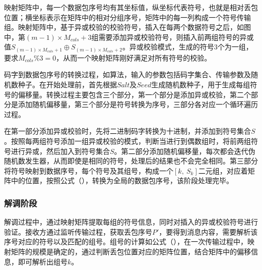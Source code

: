 映射矩阵中，每一个数据包序号均有其坐标值，纵坐标代表符号，也就是相对丢包位置；横坐标表示在矩阵中的相对分组序号，矩阵中的每一列构成一个符号传输组。映射矩阵中，基于异或校验的校验符号，插入在每两个数据符号之后，如图中，第$(m-1)\times M_{cols}+3$组需要添加异或校验符号，则插入前两组符号的异或值$S_{(m-1)\times M_{cols}+1}\oplus S_{(m-1)\times M_{cols}+2}$。异或校验模式，生成的符号3个为一组，要求$M_{cols}\%3=0$，从而一个映射矩阵刚好满足对所有符号的校验。

码字到数据包序号的转换过程，如算法，输入的参数包括码字集合、传输参数及随机数种子。在开始处理前，首先根据$Salt$及$Seed$生成随机数种子，用于生成每组符号的偏移量。转换过程主要包含三个部分，第一个部分是添加异或校验，第二个部分是添加随机偏移量，第三个部分是符号转换为序号，三部分各对应一个循环遍历过程。

在第一部分添加异或校验时，先将二进制码字转换为十进制，并添加到符号集合$S$。按照每两组符号添加一组异或校验的模式，判断当进行到偶数组时，将前两组符号进行异或，然后加入到符号集合$S$。第二部分添加随机偏移量，每次都会迭代伪随机数发生器，从而即使是相同的符号，处理后的结果也不会完全相同。第三部分将符号映射到数据序号，每个符号及其组号，构成一个$[k,\ S_{k}]$二元组，对应着矩阵中的位置，按照公式（），转换为全局的数据包序号，该阶段处理完毕。

\subsubsection{解调阶段}
\label{chap:hash:robustness:xor:demodulation}


解调过程中，通过映射矩阵提取每组的符号信息，同时对插入的异或校验符号进行验证。接收方通过监听传输过程，获取丢包序号$P'$，要得到消息内容，需要解析该序号对应的符号以及匹配的组号。组号的计算如公式（），在一次传输过程中，映射矩阵的规模是确定的，通过判断丢包位置对应的矩阵位置，结合矩阵中的偏移信息，即可解析出组号$k$。

